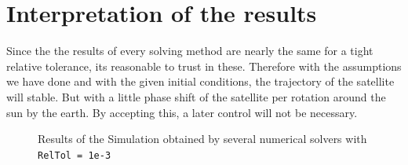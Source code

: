 \documentclass[11pt,a4paper,oneside]{scrartcl}
\begin{document}
\section{Interpretation of the results}
Since the the results of every solving method are nearly the same for a tight relative tolerance, its reasonable to trust in these. 
Therefore with the assumptions we have done and with the given initial conditions, the trajectory of the satellite will stable. But with a little phase shift of the satellite per rotation around the sun by the earth. By accepting this, a later control will not be  necessary. 


\begin{figure}
\begin{centering}
\end{centering}
\caption{Results of the Simulation obtained by several numerical solvers with \texttt{RelTol = 1e-3}}
\label{fig:sol_1e-3}
\end{figure}
\end{document}

